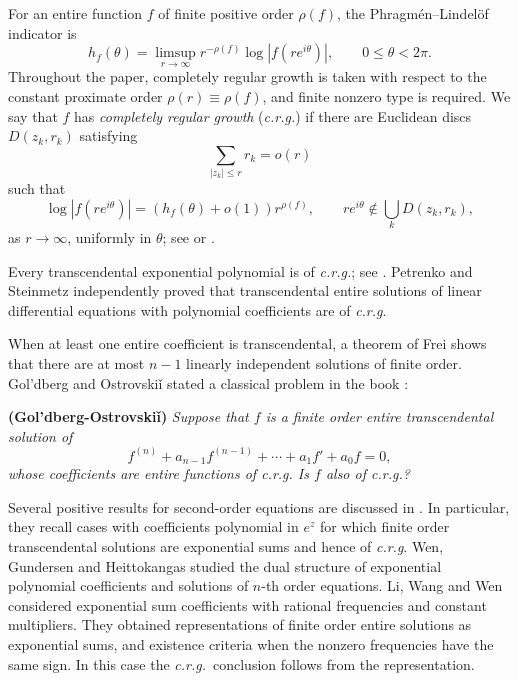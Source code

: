 \documentclass[a4paper,12pt]{article}
\numberwithin{equation}{section}
\begin{document}
\bigskip
For an entire function $f$ of finite positive order $\rho(f)$,
the Phragm\'en--Lindel\"of indicator is
\[
 h_f(\theta)=\limsup_{r\to\infty}
             r^{-\rho(f)}\log|f(re^{i\theta})|,
 \qquad 0\le\theta<2\pi.
\]
Throughout the paper, completely regular growth is taken with respect
to the constant proximate order $\rho(r)\equiv\rho(f)$, and finite
nonzero type is required.
We say that $f$ has \emph{completely regular growth} (\textit{c.r.g.}) if there
are Euclidean discs $D(z_k,r_k)$ satisfying
\begin{equation}\label{r.eq}
 \sum_{|z_k|\le r}r_k=o(r)
\end{equation}
such that
\begin{equation}\label{crg}
 \log|f(re^{i\theta})|=(h_f(\theta)+o(1))r^{\rho(f)},
 \qquad re^{i\theta}\notin\bigcup_kD(z_k,r_k),
\end{equation}
as $r\to\infty$, uniformly in $\theta$;
see \cite[pp.~139--140]{Levin1} or \cite[pp.~6--8]{Ronkin}.
     
Every transcendental exponential polynomial is of \textit{c.r.g.}; see
\cite[Lemma~1.3]{GOP}.
Petrenko \cite[pp.~104--112]{Petru} and Steinmetz \cite{Stein}
independently proved that transcendental entire solutions of linear
differential equations with polynomial coefficients are of \textit{c.r.g}.

When at least one entire coefficient is transcendental, a theorem of
Frei \cite{Frei} shows that there are at most $n-1$ linearly independent
solutions of finite order.
      Gol'dberg and Ostrovski\v{i} stated a classical problem in the  book \cite[p.~300]{problembook}:
    
    \bigskip
     \noindent
    	\textbf{(Gol'dberg-Ostrovski\v{i})} \emph{Suppose that $f$ is a finite order entire transcendental solution of 
    		$$
    	f^{(n)}+a_{n-1}f^{(n-1)}+\cdots+a_1f'+a_0f=0,
    	$$
    	whose coefficients are entire functions of \textit{c.r.g}. Is $f$ also of \textit{c.r.g.}?}

    \bigskip
Several positive results for second-order equations are discussed in 
\cite[Section~4]{GOP}. In particular, they recall cases with coefficients
polynomial in $e^z$ for which finite order transcendental solutions
are exponential sums and hence of \textit{c.r.g}.
Wen, Gundersen and Heittokangas \cite{DualExp} studied the dual structure
of exponential polynomial coefficients and solutions of $n$-th order equations. 
Li, Wang and Wen \cite{LiWangWen} considered exponential sum coefficients
with rational frequencies and constant multipliers. They obtained
representations of finite order entire solutions as exponential sums,
and existence criteria when the nonzero frequencies have the same sign.
In this case the \textit{c.r.g.}\ conclusion follows from the representation.
\end{document}

